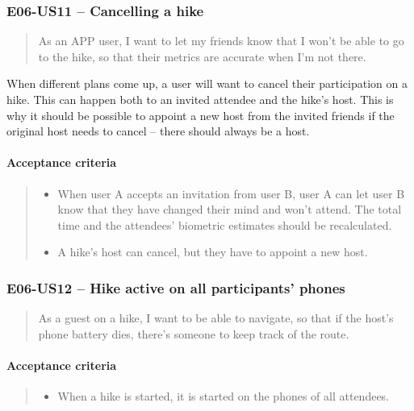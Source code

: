 \subsubsection*{E06-US11 -- Cancelling a hike}
\begin{quote}
As an APP user, I want to let my friends know that I won't be able to go to the hike, so that their metrics are accurate when I'm not there.
\end{quote}

When different plans come up, a user will want to cancel their participation on a hike.
This can happen both to an invited attendee and the hike's host.
This is why it should be possible to appoint a new host from the invited friends if the original host needs to cancel -- there should always be a host.

\paragraph*{Acceptance criteria}
\begin{quote}
\begin{itemize}
    \item When user A accepts an invitation from user B, user A can let user B know that they have changed their mind and won't attend. The total time and the attendees' biometric estimates should be recalculated.
    \item A hike's host can cancel, but they have to appoint a new host.
\end{itemize}
\end{quote}

\subsubsection*{E06-US12 -- Hike active on all participants' phones}
\begin{quote}
As a guest on a hike, I want to be able to navigate, so that if the host's phone battery dies, there's someone to keep track of the route.
\end{quote}

\paragraph*{Acceptance criteria}
\begin{quote}
\begin{itemize}
    \item When a hike is started, it is started on the phones of all attendees.
\end{itemize}
\end{quote}

